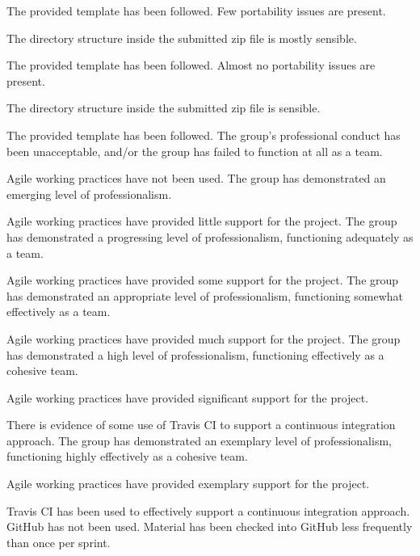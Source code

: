 \documentclass{../fal_assignment}
\begin{document}
\begin{markingrubric}
            \par The provided template has been followed.
        \grade Few portability issues are present.
            \par The directory structure inside the submitted zip file is mostly sensible.
            \par The provided template has been followed.
        \grade Almost no portability issues are present.
            \par The directory structure inside the submitted zip file is sensible.
            \par The provided template has been followed.
%
        \grade\fail The group's professional conduct has been unacceptable,
            and/or the group has failed to function at all as a team.
            \par Agile working practices have not been used.
        \grade The group has demonstrated an emerging level of professionalism.
            \par Agile working practices have provided little support for the project.
        \grade The group has demonstrated a progressing level of professionalism,
            functioning adequately as a team.
            \par Agile working practices have provided some support for the project.
        \grade The group has demonstrated an appropriate level of professionalism,
            functioning somewhat effectively as a team.
            \par Agile working practices have provided much support for the project.
        \grade The group has demonstrated a high level of professionalism,
            functioning effectively as a cohesive team.
            \par Agile working practices have provided significant support for the project.
            \par There is evidence of some use of Travis CI to support a continuous integration approach.
        \grade The group has demonstrated an exemplary level of professionalism,
            functioning highly effectively as a cohesive team.
            \par Agile working practices have provided exemplary support for the project.
            \par Travis CI has been used to effectively support a continuous integration approach.
%
        \grade\fail GitHub has not been used.
        \grade Material has been checked into GitHub less frequently than once per sprint.

\end{markingrubric}
\end{document}
